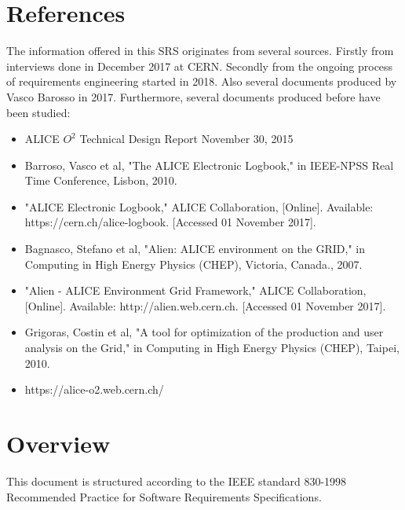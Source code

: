 \section{References}
The information offered in this SRS originates from several sources. Firstly from interviews done in December 2017 at CERN. Secondly from the ongoing process of requirements engineering started in 2018. Also several documents produced by Vasco Barosso in 2017. Furthermore, several documents produced before have been studied:
\begin{itemize}
  \item ALICE $O^2$ Technical Design Report November 30, 2015
  \item Barroso, Vasco et al, "The ALICE Electronic Logbook," in IEEE-NPSS Real Time Conference, Lisbon, 2010.
  \item "ALICE Electronic Logbook," ALICE Collaboration, [Online]. Available: https://cern.ch/alice-logbook. [Accessed 01 November 2017].
  \item Bagnasco, Stefano et al, "Alien: ALICE environment on the GRID," in Computing in High Energy Physics (CHEP), Victoria, Canada., 2007.
  \item "Alien - ALICE Environment Grid Framework," ALICE Collaboration, [Online]. Available: http://alien.web.cern.ch. [Accessed 01 November 2017].
  \item Grigoras, Costin et al, "A tool for optimization of the production and user analysis on the Grid," in Computing in High Energy Physics (CHEP), Taipei, 2010. 
  \item https://alice-o2.web.cern.ch/
\end{itemize}


\section{Overview}
This document is structured according to the IEEE standard 830-1998 Recommended Practice for Software Requirements Specifications.

